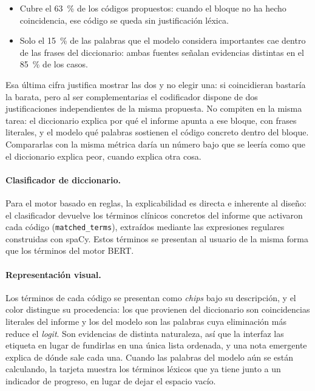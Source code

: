 \begin{itemize}
 \item Cubre el 63~\% de los códigos propuestos: cuando el bloque no ha hecho coincidencia, ese código se queda sin justificación léxica.
 \item Solo el 15~\% de las palabras que el modelo considera importantes cae dentro de las frases del diccionario: ambas fuentes señalan evidencias distintas en el 85~\% de los casos.
\end{itemize}

Esa última cifra justifica mostrar las dos y no elegir una: si coincidieran bastaría la barata, pero al ser complementarias el codificador dispone de dos justificaciones independientes de la misma propuesta. No compiten en la misma tarea: el diccionario explica por qué el informe apunta a ese bloque, con frases literales, y el modelo qué palabras sostienen el código concreto dentro del bloque. Compararlas con la misma métrica daría un número bajo que se leería como que el diccionario explica peor, cuando explica otra cosa.


\paragraph{Clasificador de diccionario.}
Para el motor basado en reglas, la explicabilidad es directa e inherente al diseño: el clasificador devuelve los términos clínicos concretos del informe que activaron cada código (\texttt{matched\_terms}), extraídos mediante las expresiones regulares construidas con spaCy. Estos términos se presentan al usuario de la misma forma que los términos del motor BERT.

\paragraph{Representación visual.}
Los términos de cada código se presentan como \emph{chips} bajo su descripción, y el color distingue su procedencia: los que provienen del diccionario son coincidencias literales del informe y los del modelo son las palabras cuya eliminación más reduce el \emph{logit}. Son evidencias de distinta naturaleza, así que la interfaz las etiqueta en lugar de fundirlas en una única lista ordenada, y una nota emergente explica de dónde sale cada una. Cuando las palabras del modelo aún se están calculando, la tarjeta muestra los términos léxicos que ya tiene junto a un indicador de progreso, en lugar de dejar el espacio vacío.

